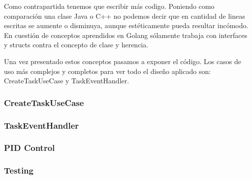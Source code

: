 Como contrapartida tenemos que escribir más codigo. Poniendo como comparación una clase Java o C++ no podemos decir que en cantidad de lineas escritas se aumente o disminuya, aunque estéticamente pueda resultar incómodo. En cuestión de conceptos aprendidos en Golang sólamente trabaja con interfaces y structs contra el concepto de clase y herencia.

Una vez presentado estos conceptos pasamos a exponer el código. Los casos de uso más complejos y completos para ver todo el diseño aplicado son: CreateTaskUseCase y TaskEventHandler.

\subsubsection{CreateTaskUseCase}\label{subsubsec:CreateTaskUseCase}
    
\subsubsection{TaskEventHandler}
    
\subsubsection{PID Control}\label{subsubsec:pidControl}
    
\subsubsection{Testing}
    



